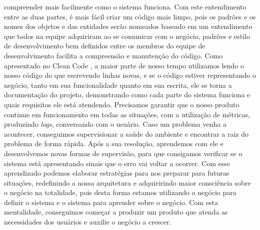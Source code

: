   compreender mais facilmente como o sistema funciona. Com este entendimento
  entre as duas partes, é mais fácil criar um código mais limpo, pois os padrões
  e os nomes dos objetos e das entidades serão nomeados baseado em um entendimento
  que todos na equipe adquiriram ao se comunicar com o negócio, padrões e estilo de
  desenvolvimento bem definidos entre os membros do equipe de desenvolvimento facilita
  a compreensão e manutenção do código. Como apresentado no Clean Code \cite{CleanCode},
  a maior parte de nosso tempo utilizamos lendo o nosso código do que escrevendo
  linhas novas, e se o código estiver representando o negócio, tanto em sua
  funcionalidade quanto em sua escrita, ele se torna a documentação do projeto,
  demonstrando como cada parte do sistema funciona e quais requisitos ele está
  atendendo. \newline
  Precisamos garantir que o nosso produto continue em funcionamento em todas as
  situações, com a utilização de métricas, produzindo \textit{logs}, conversando
  com o usuário. Caso um problema venha a acontecer, conseguimos supervisionar
  a saúde do ambiente e encontrar a raiz do problema de forma rápida. Após a
  sua resolução, aprendemos com ele e desenvolvemos novas formas de supervisão,
  para que consigamos verificar se o sistema está apresentando sinais que o erro
  vai voltar a ocorrer. Com esse aprendizado podemos elaborar estratégias para
  nos preparar para futuras situações, redefinindo a nossa arquitetura e
  adquiririndo maior consciência sobre o negócio na totalidade, pois desta forma
  estamos utilizando o negócio para definir o sistema e o sistema para aprender
  sobre o negócio. Com esta mentalidade, conseguimos começar a produzir um produto
  que atenda as necessidades dos usuários e auxilie o negócio a crescer.

